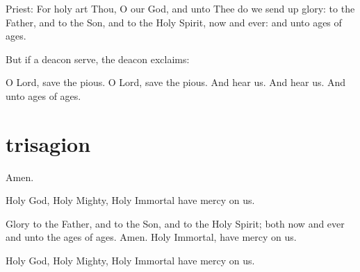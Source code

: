 \begin{liturgicaltext}
    \priest Priest: For holy art Thou, O our God, and unto Thee do we send up glory: to the Father, and to the Son, and to the Holy Spirit, now and ever:  and unto ages of ages.
\end{liturgicaltext}

\begin{rubricsection}

\begin{rubricmed}
    But if a deacon serve, the deacon exclaims:
\end{rubricmed}

\begin{liturgicaltext}
    \deacon O Lord, save the pious.
    \choir O Lord, save the pious.
    \deacon And hear us.
    \choir And hear us.
    \deacon And unto ages of ages.
\end{liturgicaltext}

\end{rubricsection}

\section{trisagion}

\begin{hymn}
    Amen.
    
    Holy God, Holy Mighty, Holy Immortal have mercy on us. 
    
    Glory to the Father, and to the Son, and to the Holy Spirit; both now and ever and unto the ages of ages. Amen. Holy Immortal, have mercy on us.

    Holy God, Holy Mighty, Holy Immortal have mercy on us.

\end{hymn}